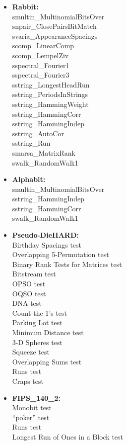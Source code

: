 \begin{itemize}
\item{\textbf{Rabbit:}}\\smultin\_MultinomialBitsOver\\ 
snpair\_ClosePairsBitMatch\\ 
svaria\_AppearanceSpacings\\ 
scomp\_LinearComp\\ 
scomp\_LempelZiv\\ 
sspectral\_Fourier1\\ 
sspectral\_Fourier3\\ 
sstring\_LongestHeadRun\\ 
sstring\_PeriodsInStrings\\ 
sstring\_HammingWeight\\ 
sstring\_HammingCorr\\ 
sstring\_HammingIndep\\ 
sstring\_AutoCor\\ 
sstring\_Run\\ 
smarsa\_MatrixRank\\ 
swalk\_RandomWalk1\\ 

\item{\textbf{Alphabit:}}\\smultin\_MultinomialBitsOver\\ 
sstring\_HammingIndep\\ 
sstring\_HammingCorr\\ 
swalk\_RandomWalk1 \\ 


\item{\textbf{Pseudo-DieHARD:}}\\Birthday Spacings test\\ 
Overlapping 5-Permutation test\\ 
Binary Rank Tests for Matrices test\\ 
Bitstream test\\ 
OPSO test\\ 
OQSO test\\ 
DNA test\\ 
Count-the-1's test\\ 
Parking Lot test\\ 
Minimum Distance test\\ 
3-D Spheres test\\ 
Squeeze test\\ 
Overlapping Sums test\\ 
Runs test\\ 
Craps test\\ 

\item{\textbf{FIPS\_140\_2:}}\\Monobit test\\ 
``poker'' test\\ 
Runs test\\ 
Longest Run of Ones in a Block test

\end{itemize}

